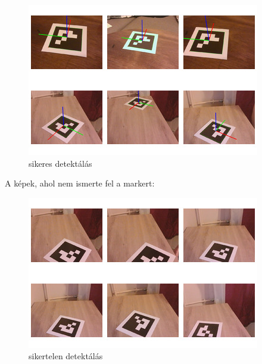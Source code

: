 \begin{figure}[htp]
    \centering
   	\includegraphics[width=7truecm, height=5truecm]{images/detect.jpg}
	\caption{sikeres detektálás}
\end{figure}

A képek, ahol nem ismerte fel a markert:
\begin{figure}[htp]
    \centering
   	\includegraphics[width=7truecm, height=5truecm]{images/not_detect.jpg}
	\caption{sikertelen detektálás}
\end{figure}

